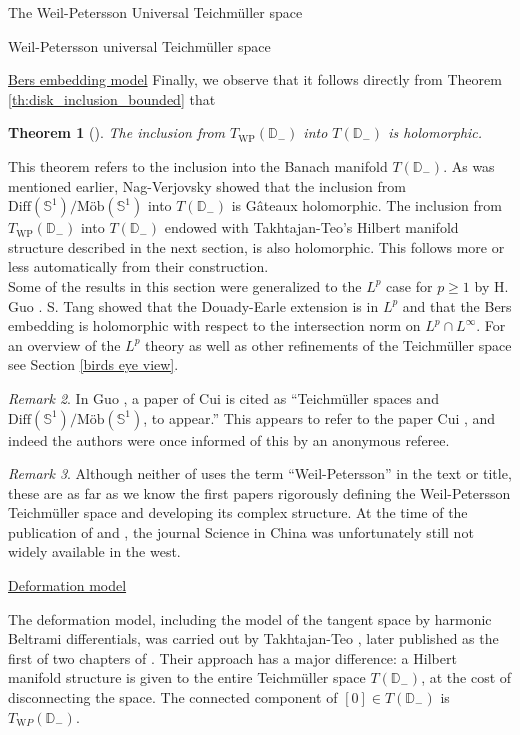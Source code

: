 \documentclass[12pt]{amsart}
\newcommand{\disk}{\ensuremath{\mathbb{D}} } %
\theoremstyle{plain}
\newtheorem{theorem}{Theorem}[section]
\theoremstyle{definition}
\theoremstyle{remark}
\newtheorem{remark}[theorem]{Remark}
\numberwithin{equation}{section} %
\numberwithin{figure}{section} %
\begin{document}
\begin{section}{The Weil-Petersson Universal Teichm\"uller space}
\begin{subsection}{Weil-Petersson universal Teichm\"uller space}
\begin{subsubsection}{\underline{Bers embedding model}}
Finally, we observe that it follows directly from Theorem \ref{th:disk_inclusion_bounded} that 
\begin{theorem}[\cite{Cui,Takhtajan_Teo_Memoirs}] 
 \label{th:inclusion_universal_holomorphic} The inclusion from $T_{\mathrm{WP}}(\disk_-)$ into $T(\disk_-)$ is holomorphic. 
\end{theorem}
This theorem refers to the inclusion into the Banach manifold $T(\disk_-)$. As was mentioned earlier, Nag-Verjovsky \cite{NagVerjovsky} showed that the inclusion from $\text{Diff}(\mathbb{S}^1)/\text{M\"ob}(\mathbb{S}^1)$ into $T(\disk_-)$ is G\^ateaux holomorphic.   The inclusion from $T_{\mathrm{WP}}(\disk_-)$ into $T(\disk_-)$ endowed with Takhtajan-Teo's Hilbert manifold structure described in the next section, is also holomorphic. This follows more or less automatically from their construction.\\ 

Some of the results in this section were generalized to the $L^p$ case for $p \geq 1$ by H. Guo \cite{GuoHui}. S. Tang showed that the Douady-Earle
extension is in $L^p$ and that the Bers embedding is holomorphic with respect to the 
intersection norm on $L^p \cap L^\infty$. {For an overview of the $L^p$ theory as well as other refinements of the Teichm\"uller space see Section \ref{birds eye view}.} 
\begin{remark} In Guo \cite{GuoHui}, a paper of Cui is cited as ``Teichm\"uller spaces and $\text{Diff}(\mathbb{S}^1)/\text{M\"ob}(\mathbb{S}^1)$, to appear.'' This appears to refer to the paper Cui \cite{Cui}, and indeed the authors were once informed of this by an anonymous referee.  
\end{remark}
\begin{remark}
Although neither of \cite{Cui,GuoHui} uses the term ``Weil-Petersson'' in the text or title, these are as far as we know the first papers rigorously defining the Weil-Petersson Teichm\"uller space and developing its complex structure.
At the time of the publication of \cite{Cui} and \cite{GuoHui}, the journal Science in China was unfortunately still not widely available in the west.\\ 
\end{remark}
\end{subsubsection}
\begin{subsubsection}{{\underline{Deformation model}}} \label{se:universal_WP_deformation}

 The deformation model, including the model of the tangent space by harmonic Beltrami differentials, was carried out by Takhtajan-Teo \cite{TT_arxiv_1}, later published as the first of two chapters of  \cite{Takhtajan_Teo_Memoirs}. Their approach has a major difference: a Hilbert manifold structure is given to the entire Teichm\"uller space $T(\disk_-)$, at the cost of disconnecting the space. The connected component of $[0] \in T(\disk_-)$ is $T_{\mathrm WP}(\disk_-)$. 


\end{subsubsection}
\end{subsection}
\end{section}
\end{document}
